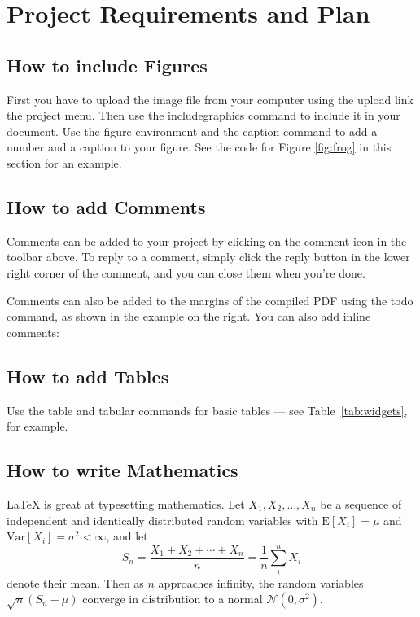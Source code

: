 \documentclass[a4paper]{article}
\begin{document}
\section{Project Requirements and Plan}

\subsection{How to include Figures}

First you have to upload the image file from your computer using the upload link the project menu. Then use the includegraphics command to include it in your document. Use the figure environment and the caption command to add a number and a caption to your figure. See the code for Figure \ref{fig:frog} in this section for an example.


\subsection{How to add Comments}

Comments can be added to your project by clicking on the comment icon in the toolbar above. %
%
%
To reply to a comment, simply click the reply button in the lower right corner of the comment, and you can close them when you're done.

Comments can also be added to the margins of the compiled PDF using the todo command, as shown in the example on the right. You can also add inline comments:


\subsection{How to add Tables}

Use the table and tabular commands for basic tables --- see Table~\ref{tab:widgets}, for example. 


\subsection{How to write Mathematics}

\LaTeX{} is great at typesetting mathematics. Let $X_1, X_2, \ldots, X_n$ be a sequence of independent and identically distributed random variables with $\text{E}[X_i] = \mu$ and $\text{Var}[X_i] = \sigma^2 < \infty$, and let
\[S_n = \frac{X_1 + X_2 + \cdots + X_n}{n}
      = \frac{1}{n}\sum_{i}^{n} X_i\]
denote their mean. Then as $n$ approaches infinity, the random variables $\sqrt{n}(S_n - \mu)$ converge in distribution to a normal $\mathcal{N}(0, \sigma^2)$.
\end{document}

